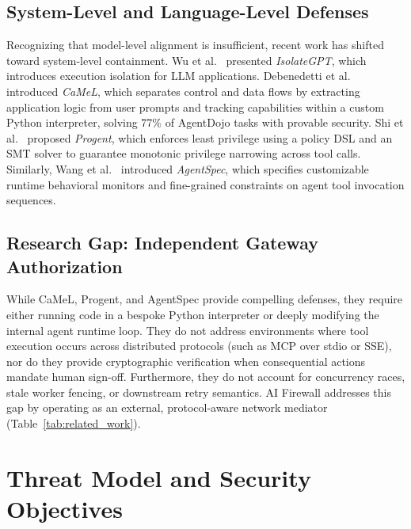 \documentclass[sigconf,anonymous,review]{acmart}
\begin{document}
\subsection{System-Level and Language-Level Defenses}
Recognizing that model-level alignment is insufficient, recent work has shifted toward system-level containment. Wu et al.~\cite{wu2025isolategpt} presented \emph{IsolateGPT}, which introduces execution isolation for LLM applications. Debenedetti et al.~\cite{debenedetti2025camel} introduced \emph{CaMeL}, which separates control and data flows by extracting application logic from user prompts and tracking capabilities within a custom Python interpreter, solving 77\% of AgentDojo tasks with provable security. Shi et al.~\cite{shi2025progent} proposed \emph{Progent}, which enforces least privilege using a policy DSL and an SMT solver to guarantee monotonic privilege narrowing across tool calls. Similarly, Wang et al.~\cite{wang2026agentspec} introduced \emph{AgentSpec}, which specifies customizable runtime behavioral monitors and fine-grained constraints on agent tool invocation sequences.

\subsection{Research Gap: Independent Gateway Authorization}
While CaMeL, Progent, and AgentSpec provide compelling defenses, they require either running code in a bespoke Python interpreter or deeply modifying the internal agent runtime loop. They do not address environments where tool execution occurs across distributed protocols (such as MCP over stdio or SSE), nor do they provide cryptographic verification when consequential actions mandate human sign-off. Furthermore, they do not account for concurrency races, stale worker fencing, or downstream retry semantics. AI Firewall addresses this gap by operating as an external, protocol-aware network mediator (Table~\ref{tab:related_work}).

\section{Threat Model and Security Objectives}
\end{document}
